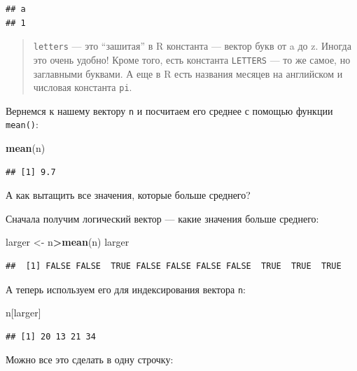 \documentclass[]{book}
\newenvironment{Shaded}{\begin{snugshade}}{\end{snugshade}}
\newcommand{\KeywordTok}[1]{\textcolor[rgb]{0.13,0.29,0.53}{\textbf{#1}}}
\newcommand{\StringTok}[1]{\textcolor[rgb]{0.31,0.60,0.02}{#1}}
\newcommand{\OperatorTok}[1]{\textcolor[rgb]{0.81,0.36,0.00}{\textbf{#1}}}
\newcommand{\NormalTok}[1]{#1}
\begin{document}
\begin{verbatim}
## a 
## 1
\end{verbatim}

\begin{quote}
\texttt{letters} --- это ``зашитая'' в R константа --- вектор букв от a
до z. Иногда это очень удобно! Кроме того, есть константа
\texttt{LETTERS} --- то же самое, но заглавными буквами. А еще в R есть
названия месяцев на английском и числовая константа \texttt{pi}.
\end{quote}

Вернемся к нашему вектору \texttt{n} и посчитаем его среднее с помощью
функции \texttt{mean()}:

\begin{Shaded}
\begin{Highlighting}[]
\KeywordTok{mean}\NormalTok{(n)}
\end{Highlighting}
\end{Shaded}

\begin{verbatim}
## [1] 9.7
\end{verbatim}

А как вытащить все значения, которые больше среднего?

Сначала получим логический вектор --- какие значения больше среднего:

\begin{Shaded}
\begin{Highlighting}[]
\NormalTok{larger <-}\StringTok{ }\NormalTok{n}\OperatorTok{>}\KeywordTok{mean}\NormalTok{(n)}
\NormalTok{larger}
\end{Highlighting}
\end{Shaded}

\begin{verbatim}
##  [1] FALSE FALSE  TRUE FALSE FALSE FALSE FALSE  TRUE  TRUE  TRUE
\end{verbatim}

А теперь используем его для индексирования вектора \texttt{n}:

\begin{Shaded}
\begin{Highlighting}[]
\NormalTok{n[larger]}
\end{Highlighting}
\end{Shaded}

\begin{verbatim}
## [1] 20 13 21 34
\end{verbatim}

Можно все это сделать в одну строчку:
\end{document}
